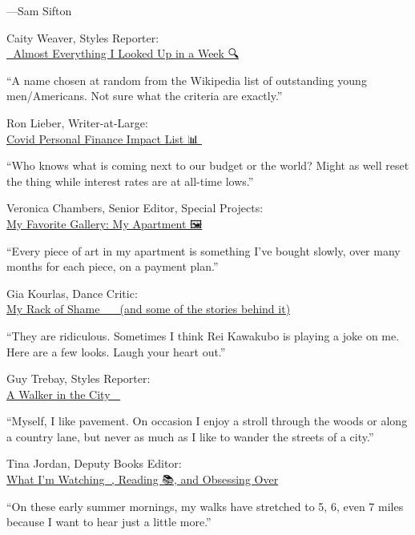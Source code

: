---Sam Sifton

Caity Weaver, Styles Reporter:\\
\href{https://docs.google.com/document/d/1FUvduEhVRL_s-G6Vf8X9U4qMucuYCdI-OuceMRMMfEE/edit?usp=sharing}{🔎
Almost Everything I Looked Up in a Week 🔍}

``A name chosen at random from the Wikipedia list of outstanding young
men/Americans. Not sure what the criteria are exactly.''

Ron Lieber, Writer-at-Large:\\
\href{https://docs.google.com/spreadsheets/d/1u2zcIpiZ9fQeRjfnxB7Mnycaaxt0JjTwOjULoBV7igY/edit\#gid=0}{Covid
Personal Finance Impact List 📊🔬}

``Who knows what is coming next to our budget or the world? Might as
well reset the thing while interest rates are at all-time lows.''

Veronica Chambers, Senior Editor, Special Projects:\\
\href{https://docs.google.com/document/d/1Zp_jsLRwtGejnw9ZanFu9pVVG21V1LiCClqce2YXMyA/edit?usp=sharing}{My
Favorite Gallery: My Apartment 🖼}

``Every piece of art in my apartment is something I've bought slowly,
over many months for each piece, on a payment plan.''

Gia Kourlas, Dance Critic:\\
\href{https://docs.google.com/document/d/1JKZ61rGny4oYL2FTjWVZh0SkPEB2I5oIqw-njZK8GwY/edit?usp=sharing}{My
Rack of Shame 👗👔🧥🎩 (and some of the stories behind it)}

``They are ridiculous. Sometimes I think Rei Kawakubo is playing a joke
on me. Here are a few looks. Laugh your heart out.''

Guy Trebay, Styles Reporter:\\
\href{https://docs.google.com/document/d/1Loq9kKsm3EysWDt7AqZseaedoB-28-lRx6n9O4ml2xU/edit?usp=sharing}{A
Walker in the City 👟🏰}

``Myself, I like pavement. On occasion I enjoy a stroll through the
woods or along a country lane, but never as much as I like to wander the
streets of a city.''

Tina Jordan, Deputy Books Editor:\\
\href{https://docs.google.com/document/d/1uFxoHSPLjX7Z-9lTzRZzd0n0AF9dRC1azLebtP6WF_Y/edit}{What
I'm Watching 👀, Reading 📚, and Obsessing Over}

``On these early summer mornings, my walks have stretched to 5, 6, even
7 miles because I want to hear just a little more.''

